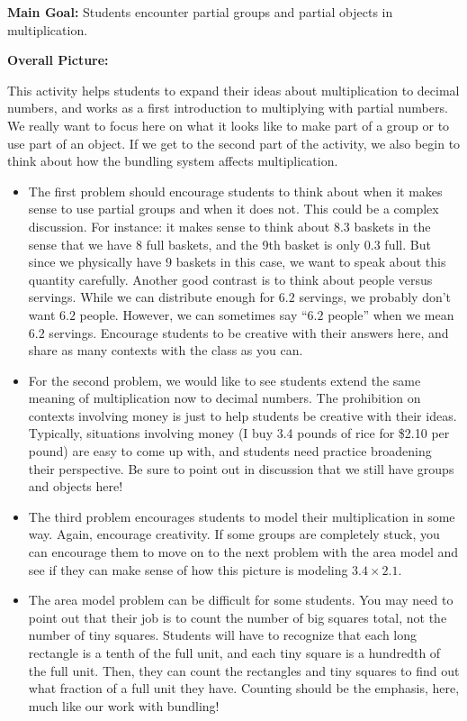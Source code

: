 \documentclass[nooutcomes,noauthor,handout]{ximera}
\begin{document}
\begin{instructorNotes}

{\bf Main Goal:} Students encounter partial groups and partial objects in multiplication.

{\bf Overall Picture:}

This activity helps students to expand their ideas about multiplication to decimal numbers, and works as a first introduction to multiplying with partial numbers. We really want to focus here on what it looks like to make part of a group or to use part of an object. If we get to the second part of the activity, we also begin to think about how the bundling system affects multiplication.


\begin{itemize}
	\item The first problem should encourage students to think about when it makes sense to use partial groups and when it does not. This could be a complex discussion. For instance: it makes sense to think about $8.3$ baskets in the sense that we have 8 full baskets, and the 9th basket is only $0.3$ full. But since we physically have $9$ baskets in this case, we want to speak about this quantity carefully. Another good contrast is to think about people versus servings. While we can distribute enough for $6.2$ servings, we probably don't want $6.2$ people. However, we can sometimes say ``$6.2$ people'' when we mean $6.2$ servings. Encourage students to be creative with their answers here, and share as many contexts with the class as you can.
	\item For the second problem, we would like to see students extend the same meaning of multiplication now to decimal numbers. The prohibition on contexts involving money is just to help students be creative with their ideas. Typically, situations involving money (I buy 3.4 pounds of rice for \$2.10 per pound) are easy to come up with, and students need practice broadening their perspective. Be sure to point out in discussion that we still have groups and objects here!
	\item The third problem encourages students to model their multiplication in some way. Again, encourage creativity. If some groups are completely stuck, you can encourage them to move on to the next problem with the area model and see if they can make sense of how this picture is modeling $3.4 \times 2.1$.
	\item The area model problem can be difficult for some students. You may need to point out that their job is to count the number of big squares total, not the number of tiny squares. Students will have to recognize that each long rectangle is a tenth of the full unit, and each tiny square is a hundredth of the full unit. Then, they can count the rectangles and tiny squares to find out what fraction of a full unit they have. Counting should be the emphasis, here, much like our work with bundling!

\end{itemize}
\end{instructorNotes}
\end{document}
